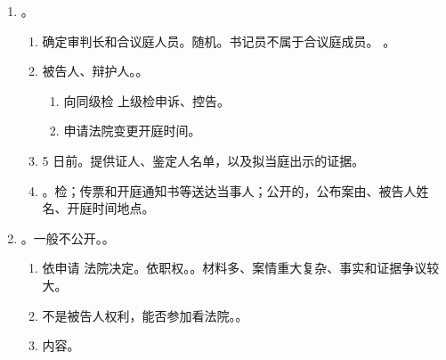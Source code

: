 \begin{enumerate}
\begin{enumerate}
\begin{enumerate}
                  \item 书面，。。
                  \item {}。。
                  \item 身份不明正常受理、审理。调查核实 \hz 用其自报的姓名。身份不明不按缺材料的情况进行处理。
                  \item {}。
                  \item 告诉才处理的 \yjt 退回 + 告知被害人提起自诉。
                \end{enumerate}
          \item {}。
                \begin{enumerate}
                  \item 确定审判长和合议庭人员。\yi 随机。\er 书记员不属于合议庭成员。
                        。
                  \item {}被告人、辩护人。。
                        \begin{enumerate}
                          \item 向同级检 \hz 上级检申诉、控告。
                          \item 申请法院变更开庭时间。
                        \end{enumerate}
                  \item 5 日前。提供证人、鉴定人名单，以及拟当庭出示的证据。
                  \item {}。检；传票和开庭通知书等送达当事人；公开的，公布案由、被告人姓名、开庭时间地点。
                \end{enumerate}
          \item {}。一般不公开。。
                \begin{enumerate}
                  \item \yi 依申请 \yjt 法院决定。\er 依职权。。材料多、案情重大复杂、事实和证据争议较大。
                  \item 不是被告人权利，能否参加看法院。。
                  \item 内容。
                        \begin{enumerate}

\end{enumerate}
\end{enumerate}
\end{enumerate}
\end{enumerate}
